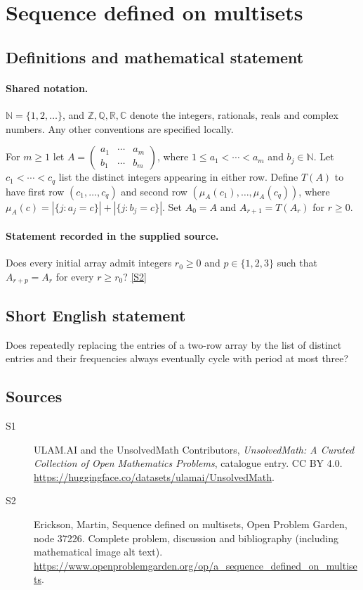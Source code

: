 \documentclass[11pt]{book}
\newcommand{\sref}[2]{\hyperlink{source:#1:#2}{[S#2]}}
\begin{document}
\section{Sequence defined on multisets}\label{statement}

\subsection{Definitions and mathematical statement}

\paragraph{Shared notation.}$\mathbb N=\{1,2,\ldots\}$, and $\mathbb Z,\mathbb Q,\mathbb R,\mathbb C$ denote the integers, rationals, reals and complex numbers. Any other conventions are specified locally.


For $m\geq1$ let $A=\begin{pmatrix}a_1&\cdots&a_m\\b_1&\cdots&b_m\end{pmatrix}$, where $1\leq a_1<\cdots<a_m$ and $b_j\in\mathbb N$. Let $c_1<\cdots<c_q$ list the distinct integers appearing in either row. Define $T(A)$ to have first row $(c_1,\ldots,c_q)$ and second row $(\mu_A(c_1),\ldots,\mu_A(c_q))$, where $\mu_A(c)=|\{j:a_j=c\}|+|\{j:b_j=c\}|$. Set $A_0=A$ and $A_{r+1}=T(A_r)$ for $r\geq0$.
\paragraph{Statement recorded in the supplied source.}
Does every initial array admit integers $r_0\geq0$ and $p\in\{1,2,3\}$ such that $A_{r+p}=A_r$ for every $r\geq r_0$? \sref{statement}{2}
\subsection{Short English statement}
Does repeatedly replacing the entries of a two-row array by the list of distinct entries and their frequencies always eventually cycle with period at most three?
\subsection{Sources}
\begin{description}
\item[\hypertarget{source:statement:1}{S1}] ULAM.AI and the UnsolvedMath Contributors, \emph{UnsolvedMath: A Curated Collection of Open Mathematics Problems}, catalogue entry. CC BY 4.0. \url{https://huggingface.co/datasets/ulamai/UnsolvedMath}.
\item[\hypertarget{source:statement:2}{S2}] Erickson, Martin, Sequence defined on multisets, Open Problem Garden, node 37226. Complete problem, discussion and bibliography (including mathematical image alt text). \url{https://www.openproblemgarden.org/op/a_sequence_defined_on_multisets}.
\end{description}
\label{end:statement}
\end{document}
